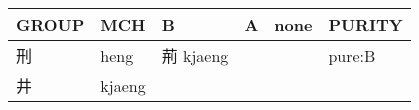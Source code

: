 \documentclass[14pt,a4paper]{scrartcl}
\begin{document}
\begin{longtable}[c]{@{}llllll@{}}
\toprule
\begin{minipage}[b]{0.14\columnwidth}\raggedright\strut
GROUP
\strut\end{minipage} &
\begin{minipage}[b]{0.14\columnwidth}\raggedright\strut
MCH
\strut\end{minipage} &
\begin{minipage}[b]{0.14\columnwidth}\raggedright\strut
B
\strut\end{minipage} &
\begin{minipage}[b]{0.14\columnwidth}\raggedright\strut
A
\strut\end{minipage} &
\begin{minipage}[b]{0.14\columnwidth}\raggedright\strut
none
\strut\end{minipage} &
\begin{minipage}[b]{0.14\columnwidth}\raggedright\strut
PURITY
\strut\end{minipage}\tabularnewline
\midrule
\endhead
\begin{minipage}[t]{0.14\columnwidth}\raggedright\strut
刑
\strut\end{minipage} &
\begin{minipage}[t]{0.14\columnwidth}\raggedright\strut
heng
\strut\end{minipage} &
\begin{minipage}[t]{0.14\columnwidth}\raggedright\strut
荊 kjaeng
\strut\end{minipage} &
\begin{minipage}[t]{0.14\columnwidth}\raggedright\strut
\strut\end{minipage} &
\begin{minipage}[t]{0.14\columnwidth}\raggedright\strut
\strut\end{minipage} &
\begin{minipage}[t]{0.14\columnwidth}\raggedright\strut
pure:B
\strut\end{minipage}\tabularnewline
\begin{minipage}[t]{0.14\columnwidth}\raggedright\strut
井
\strut\end{minipage} &
\begin{minipage}[t]{0.14\columnwidth}\raggedright\strut
kjaeng
\strut\end{minipage} &
\begin{minipage}[t]{0.14\columnwidth}\raggedright\strut
\strut\end{minipage} &
\begin{minipage}[t]{0.14\columnwidth}\raggedright\strut

\end{minipage}
\end{longtable}
\end{document}
